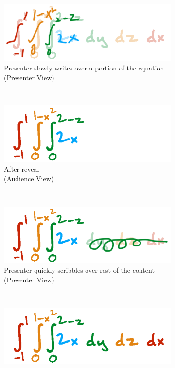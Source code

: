 \begin{figure}[t!]
    \centering
    \begin{subfigure}[t]{0.5\columnwidth}
        \centering
        \includegraphics[width=1\columnwidth]{figures/slowink_presenter}
        \caption{Presenter slowly writes over a portion of the equation (Presenter View)}
    \end{subfigure}%
    ~ 
    \begin{subfigure}[t]{0.5\columnwidth}
        \centering
        \includegraphics[width=1\columnwidth]{figures/slowink_audience}
        \caption{After reveal \\ (Audience View)}
    \end{subfigure}
            ~
      \begin{subfigure}[t]{0.5\columnwidth}
        \centering
        \includegraphics[width=1\columnwidth]{figures/fastink_presenter}
        \caption{Presenter quickly scribbles over rest of the content (Presenter View)}
    \end{subfigure}%
    ~ 
    \begin{subfigure}[t]{0.5\columnwidth}
        \centering
        \includegraphics[width=1\columnwidth]{figures/fastink_audience}

\end{subfigure}
\end{figure}
